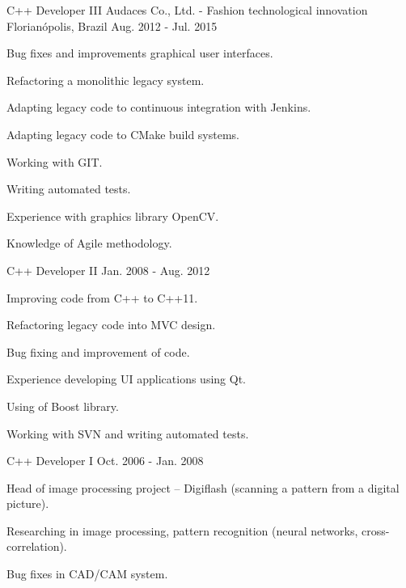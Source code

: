\begin{cventries}
  \cventry
    {C++ Developer III} %
    {Audaces Co., Ltd. - Fashion technological innovation} %
    {Florianópolis, Brazil} %
    {Aug. 2012 - Jul. 2015} %
    {
      \begin{cvitems} %
        \item {Bug fixes and improvements graphical user interfaces.}
        \item {Refactoring a monolithic legacy system.}
        \item {Adapting legacy code to continuous integration with Jenkins.}
        \item {Adapting legacy code to CMake build systems.}
        \item {Working with GIT.}
        \item {Writing automated tests.}
        \item {Experience with graphics library OpenCV.}
        \item {Knowledge of Agile methodology.}
      \end{cvitems}
    }

    \cventry
    {C++ Developer II} %
    {} %
    {} %
    {Jan. 2008 - Aug. 2012} %
    {
      \begin{cvitems} %
        \item {Improving code from C++ to C++11.}
        \item {Refactoring legacy code into MVC design.}
        \item {Bug fixing and improvement of code.}
        \item {Experience developing UI applications using Qt.}
        \item {Using of Boost library.}
        \item {Working with SVN and writing automated tests.}
      \end{cvitems}
    }

    \cventry
    {C++ Developer I} %
    {} %
    {} %
    {Oct. 2006 - Jan. 2008} %
    {
      \begin{cvitems} %
        \item {Head of image processing project – Digiflash (scanning a pattern from a digital picture).}
        \item {Researching in image processing, pattern recognition (neural networks, cross-correlation).}
        \item {Bug fixes in CAD/CAM system.}
      \end{cvitems}
    }

\end{cventries}
